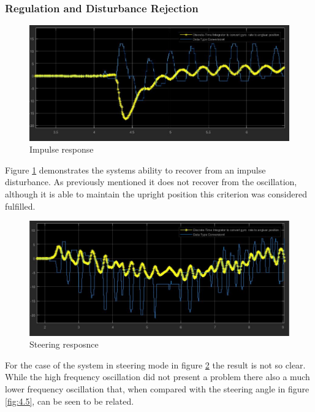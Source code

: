 \documentclass[11pt, a4paper,twocolumn ]{article}
\begin{document}
            \subsubsection{Regulation and Disturbance Rejection}
	\begin{figure}[h!]
	\begin{center}
	\includegraphics[width=\linewidth]{ImpulseDisturbance.jpg}
	\caption{Impulse response}
	\label{fig:4.3}
	\end{center}
	\end{figure}
Figure \ref{fig:4.3} demonstrates the systems ability to recover from an impulse disturbance. As previously mentioned it does not recover from the oscillation, although it is able to maintain the upright position this criterion was considered fulfilled.

	\begin{figure}[h!]
	\begin{center}
	\includegraphics[width=\linewidth]{Steering.jpg}
	\caption{Steering resposnce}
	\label{fig:4.4}
	\end{center}
	\end{figure}
For the case of the system in steering mode in figure \ref{fig:4.4} the result is not so clear. While the high frequency oscillation did not present a problem there also a much lower frequency oscillation that, when compared with the steering angle in figure \ref{fig:4.5}, can be seen to be related.
\end{document}
